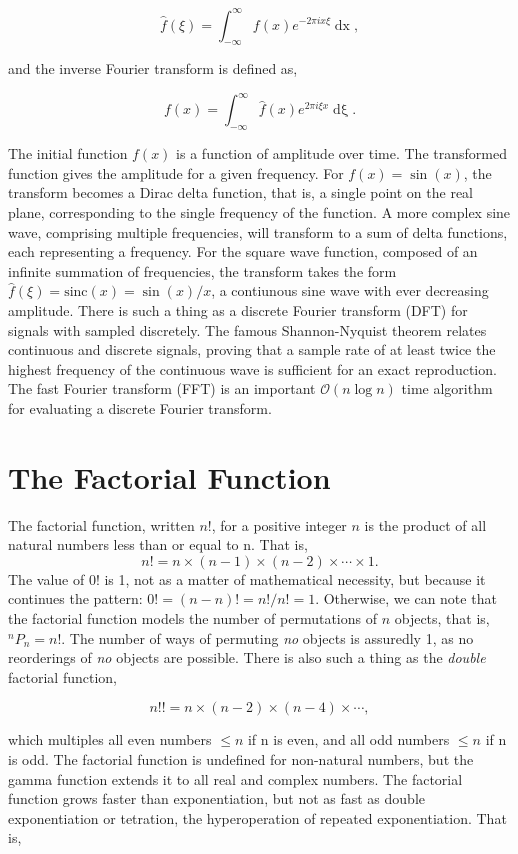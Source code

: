 \documentclass[11pt]{amsart}
\begin{document}
$$\hat{f}(\xi) = \int_{-\infty}^{\infty}f(x)e^{-2\pi ix\xi}\mathop{dx},$$

and the inverse Fourier transform is defined as,

$$f(x) = \int_{-\infty}^{\infty}\hat{f}(x)e^{2\pi i\xi x}\mathop{d\xi}.$$

The initial function $f(x)$ is a function of amplitude over time. The transformed function gives the amplitude for a given frequency. For $f(x) = \sin(x)$, the transform becomes a Dirac delta function, that is, a single point on the real plane, corresponding to the single frequency of the function. A more complex sine wave, comprising multiple frequencies, will transform to a sum of delta functions, each representing a frequency. For the square wave function, composed of an infinite summation of frequencies, the transform takes the form $\hat{f}(\xi) = \text{sinc}(x) = \sin(x)/x$, a contiunous sine wave with ever decreasing amplitude. There is such a thing as a discrete Fourier transform (DFT) for signals with sampled discretely. The famous Shannon-Nyquist theorem relates continuous and discrete signals, proving that a sample rate of at least twice the highest frequency of the continuous wave is sufficient for an exact reproduction. The fast Fourier transform (FFT) is an important $\mathcal{O}(n\log n)$ time algorithm for evaluating a discrete Fourier transform.

\section{The Factorial Function}

The factorial function, written $n!$, for a positive integer $n$ is the product of all natural numbers less than or equal to n. That is, $$n! = n \times (n - 1) \times (n - 2) \times \cdots \times 1.$$ The value of $0!$ is 1, not as a matter of mathematical necessity, but because it continues the pattern: $0! = (n - n)! = n!/n! = 1$. Otherwise, we can note that the factorial function models the number of permutations of $n$ objects, that is, $^nP_n = n!$. The number of ways of permuting \emph{no} objects is assuredly 1, as no reorderings of \emph{no} objects are possible. There is also such a thing as the \emph{double} factorial function,

$$n!! = n \times (n - 2) \times (n - 4) \times \cdots,$$

which multiples all even numbers $\leq n$ if n is even, and all odd numbers $\leq n$ if n is odd.  The factorial function is undefined for non-natural numbers, but the gamma function extends it to all real and complex numbers. The factorial function grows faster than exponentiation, but not as fast as double exponentiation or tetration, the hyperoperation of repeated exponentiation. That is,
\end{document}
